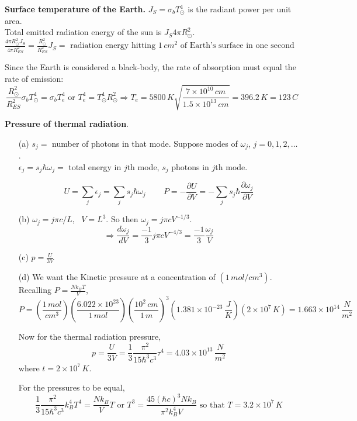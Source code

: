 \documentclass[twoside]{amsart}
\theoremstyle{plain}
\theoremstyle{definition}
\newcommand{\solutionhead}[1]
  {
   \noindent{\small\bf Solution #1.}
   }
\begin{document}
\solutionhead{5} \textbf{Surface temperature of the Earth.}  
$J_S = \sigma_b T_{\odot}^4$ is the radiant power per unit area.  \\
Total emitted radiation energy of the sun is $J_S 4\pi R_{\odot}^2$.   \quad \\
$\frac{4 \pi R_{\odot}^2 J_S }{ 4\pi R_{ES}^2} = \frac{R_{\odot}^2}{R_{ES}^2} J_S = \text{ radiation energy hitting $1 \, cm^2$ of Earth's surface in one second }$  

Since the Earth is considered a black-body, the rate of absorption must equal the rate of emission: 
\[
\frac{R_{\odot}^2}{R_{ES}^2} \sigma_b T_{\odot}^4 = \sigma_b T_e^4 \text{ or } T_e^4 = T_{\odot}^4 R_{\odot}^2 \Longrightarrow T_e = 5800 \, K \sqrt{ \frac{ 7 \times 10^{10}\, cm}{ 1.5 \times 10^{13} \, cm} } = 396.2 \, K = 123 \, C
\]




\solutionhead{6} \textbf{Pressure of thermal radiation}.  \begin{itemize}
\item[(a)] $s_j = $ number of photons in that mode.  Suppose modes of $\omega_j$, $j=0,1,2,\dots$.  \\
$\epsilon_j = s_j \hbar \omega_j = $ total energy in $j$th mode, $s_j$ photons in $j$th mode.  

\[
U = \sum_j \epsilon_j = \sum_j s_j \hbar \omega_j \quad \quad \, P = - \frac{ \partial U}{ \partial V} = - \sum_j s_j \hbar \frac{ \partial \omega_j}{\partial V}
\]
\item[(b)] $\omega_j = j\pi c/L$, \, $V= L^3$.  So then $\omega_j = j\pi c V^{-1/3}$.  
\[
\Longrightarrow \frac{d\omega_j}{dV} = \frac{-1}{3} j \pi c V^{-4/3} = \frac{-1}{3}  \frac{\omega_j}{V}
\]
\item[(c)] $p = \frac{U}{3V}$   
\item[(d)] We want the Kinetic pressure at a concentration of $(1 \, mol/cm^3)$.  Recalling $P =  \frac{Nk_B T}{V}$, 
\[
P = \left( \frac{ 1 \, mol }{ cm^3} \right) \left( \frac{ 6.022 \times 10^{23} }{ 1\, mol } \right)\left( \frac{ 10^2 \, cm}{1 \, m }\right)^3 \left( 1.381 \times 10^{-23} \, \frac{J}{K} \right) (2 \times 10^7 \, K) = 1.663 \times 10^{14} \, \frac{N}{m^2}
\]

Now for the thermal radiation pressure,
\[
p = \frac{U}{3V} = \frac{1}{3} \frac{ \pi^2}{ 15 \hbar^3 c^3 } \tau^4 = 4.03 \times 10^{13} \, \frac{N}{m^2}
\]
where $t = 2\times 10^7 \, K$.  

For the pressures to be equal, 
\[
\frac{1}{3} \frac{ \pi^2 }{15 \hbar^3 c^3} k_B^4 T^4 = \frac{Nk_B}{V} T \text{ or } T^3 = \frac{45 ( \hbar c)^3 Nk_B }{ \pi^2 k_B^4 V } \text{ so that } \boxed{ T = 3.2 \times 10^7 \, K} 
\]
\end{itemize}
\end{document}

